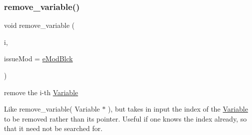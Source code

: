 \subsubsection{\texorpdfstring{remove\+\_\+variable()}{remove\_variable()}\hspace{0.1cm}{\footnotesize\ttfamily [2/2]}}
{\footnotesize\ttfamily void remove\+\_\+variable (\begin{DoxyParamCaption}\item[{\mbox{\hyperlink{group___thin_var_dep_interface___c_l_a_s_s_e_s_gaee6156e2ce80720d57a082d80f39d8cc}{c\+\_\+\+Index}}}]{i,  }\item[{\mbox{\hyperlink{group___modification___t_y_p_e_s_ga544246d8c462e9a2d817c2c30797968f}{c\+\_\+\+Mod\+Param}}}]{issue\+Mod = {\ttfamily \mbox{\hyperlink{group___modification___t_y_p_e_s_gga48fddcdd03a03f49b7e389ca1ed938d4a21b14b26b1c0093a0905f6fc010bad29}{e\+Mod\+Blck}}} }\end{DoxyParamCaption})}



remove the i-\/th \mbox{\hyperlink{class_s_m_spp__di__unipi__it_1_1_variable}{Variable}} 

Like remove\+\_\+variable( Variable $\ast$ ), but takes in input the index of the \mbox{\hyperlink{class_s_m_spp__di__unipi__it_1_1_variable}{Variable}} to be removed rather than its pointer. Useful if one knows the index already, so that it need not be searched for. \mbox{\label{class_s_m_spp__di__unipi__it_1_1_linear_function_aef04a025606c22b3e27b4aabc21b8dbc}} 
